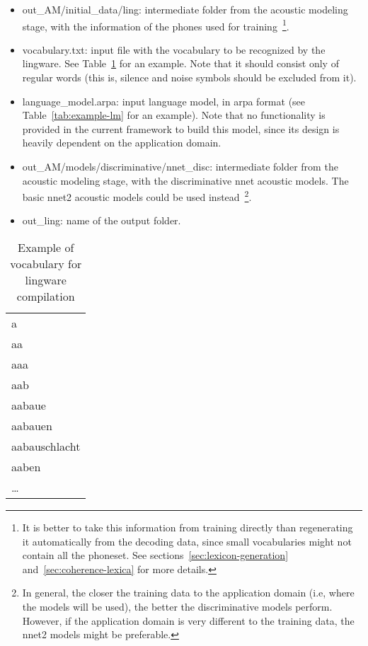 \documentclass[11pt,a4paper,titlepage,twoside]{article}
\begin{document}
\begin{itemize}
\item out\_AM/initial\_data/ling: intermediate folder from the acoustic modeling stage, with the information of the phones used for training~\footnote{It is better to take this information from training directly than regenerating it automatically from the decoding data, since small vocabularies might not contain all the phoneset. See sections~\ref{sec:lexicon-generation} and~\ref{sec:coherence-lexica} for more details.}.
\item vocabulary.txt: input file with the vocabulary to be recognized by the lingware. See Table~\ref{tab:example-vocabulary} for an example. Note that it should consist only of regular words (this is, silence and noise symbols should be excluded from it).
\item language\_model.arpa: input language model, in arpa format (see Table~\ref{tab:example-lm} for an example). Note that no functionality is provided in the current framework to build this model, since its design is heavily dependent on the application domain.
\item out\_AM/models/discriminative/nnet\_disc: intermediate folder from the acoustic modeling stage, with the discriminative nnet acoustic models. The basic nnet2 acoustic models could be used instead~\footnote{In general, the closer the training data to the application domain (i.e, where the models will be used), the better the discriminative models perform. However, if the application domain is very different to the training data, the nnet2 models might be preferable.}.
\item out\_ling: name of the output folder.
\end{itemize}

\begin{table}[htb!]
  \scriptsize
  \centering
  \begin{tabular}{|l|}
    \hline
    a \\
    aa \\
    aaa \\
    aab \\
    aabaue \\
    aabauen \\
    aabauschlacht \\
    aaben \\
    \ldots \\
    \hline
  \end{tabular}
  \caption{Example of vocabulary for lingware compilation}
  \label{tab:example-vocabulary}
\end{table}
\end{document}
